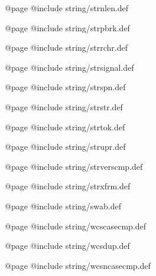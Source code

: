 @page
@include string/strnlen.def

@page
@include string/strpbrk.def

@page
@include string/strrchr.def

@page
@include string/strsignal.def

@page
@include string/strspn.def

@page
@include string/strstr.def

@page
@include string/strtok.def

@page
@include string/strupr.def

@page
@include string/strverscmp.def

@page
@include string/strxfrm.def

@page
@include string/swab.def

@page
@include string/wcscasecmp.def

@page
@include string/wcsdup.def

@page
@include string/wcsncasecmp.def
